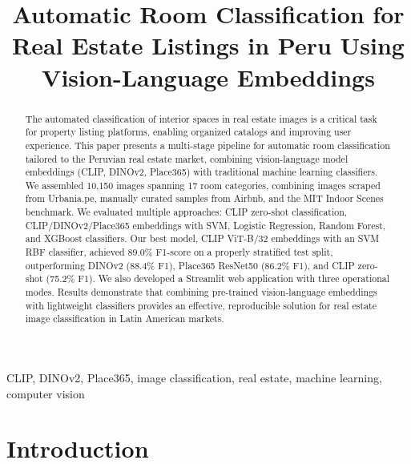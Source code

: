 \documentclass[conference]{IEEEtran}
\begin{document}
\title{Automatic Room Classification for Real Estate Listings in Peru Using Vision-Language Embeddings}

\author{
}

\maketitle

\begin{abstract}
The automated classification of interior spaces in real estate images is a critical task for property listing platforms, enabling organized catalogs and improving user experience. This paper presents a multi-stage pipeline for automatic room classification tailored to the Peruvian real estate market, combining vision-language model embeddings (CLIP, DINOv2, Place365) with traditional machine learning classifiers. We assembled 10,150 images spanning 17 room categories, combining images scraped from Urbania.pe, manually curated samples from Airbnb, and the MIT Indoor Scenes benchmark. We evaluated multiple approaches: CLIP zero-shot classification, CLIP/DINOv2/Place365 embeddings with SVM, Logistic Regression, Random Forest, and XGBoost classifiers. Our best model, CLIP ViT-B/32 embeddings with an SVM RBF classifier, achieved 89.0\% F1-score on a properly stratified test split, outperforming DINOv2 (88.4\% F1), Place365 ResNet50 (86.2\% F1), and CLIP zero-shot (75.2\% F1). We also developed a Streamlit web application with three operational modes. Results demonstrate that combining pre-trained vision-language embeddings with lightweight classifiers provides an effective, reproducible solution for real estate image classification in Latin American markets.
\end{abstract}

\begin{IEEEkeywords}
CLIP, DINOv2, Place365, image classification, real estate, machine learning, computer vision
\end{IEEEkeywords}

\section{Introduction}
\end{document}
